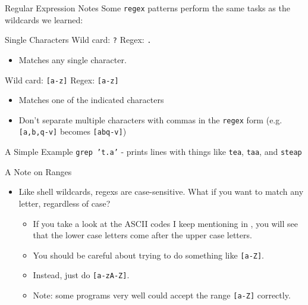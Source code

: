 \documentclass[11pt]{beamer}
\newcommand{\colbf}[1]{\textcolor{mLightBrown!77!black}{#1}}%
\begin{document}
\begin{frame}[fragile]{Regular Expression Notes}
  Some \texttt{regex} patterns perform the same tasks as the wildcards we learned:
  \begin{block}{Single Characters}
    Wild card: \texttt{?} \hspace*{2ex} Regex: \texttt{.}
    \begin{itemize}
      \item Matches any single character.
    \end{itemize}
    Wild card: \texttt{[a-z]} \hspace*{2ex} Regex: \texttt{[a-z]}
    \begin{itemize}
      \item Matches one of the indicated characters
      \item Don't separate multiple characters with commas in the \texttt{regex} form (e.g. \texttt{[a,b,q-v]}
            becomes \texttt{[abq-v]})
    \end{itemize}
  \end{block}
  \begin{block}{A Simple Example}
    \texttt{grep 't.a'} \-- prints lines with things like \texttt{tea}, \texttt{taa}, and \texttt{steap}
  \end{block}
\end{frame}

\begin{frame}[fragile]{A Note on Ranges}
  \begin{itemize}[<+- | alert@+>]
    \item Like shell wildcards, regexs are case-sensitive.  What if you want to match any letter, regardless of case?
    \begin{itemize}[<+- | alert@+>]
      \item If you take a look at the ASCII codes I keep mentioning in \cite{ascii}, you will see that the lower case
            letters come after the upper case letters.
      \item You should be careful about trying to do something like \texttt{[a-Z]}.
      \item Instead, just do \texttt{[a-zA-Z]}.
      \item \colbf{Note}: some programs very well could accept the range \texttt{[a-Z]} correctly.
    \end{itemize}
  \end{itemize}
\end{frame}
\end{document}
